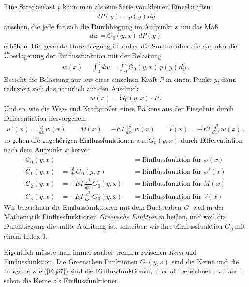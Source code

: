 Eine Streckenlast $p$ kann man als eine Serie von kleinen Einzelkr\"{a}ften
\begin{align}
dP(y) = p(y)\,dy
\end{align}
ansehen, die jede f\"{u}r sich die Durchbiegung im Aufpunkt $x$ um das Ma{\ss}
\begin{align}
dw = G_0(y,x)\,dP(y)
\end{align}
erh\"{o}hen. Die gesamte Durchbiegung ist daher die Summe \"{u}ber die $dw$, also die \"{U}berlagerung der Einflussfunktion mit der Belastung
\begin{align} \label{Eq37}
w(x) = \int_0^{\,l} dw = \int_0^{\,l} G_0(y,x)\,p(y)\,dy\,.
\end{align}
Besteht die Belastung nur aus einer einzelnen Kraft $P$ in einem Punkt $y$, dann reduziert sich das nat\"{u}rlich auf den Ausdruck
\begin{align}
w(x) = G_0(y,x) \cdot P\,.
\end{align}
Und so, wie die Weg- und Kraftgr\"{o}{\ss}en eines Balkens aus der Biegelinie durch Differentiation hervorgehen,
\begin{align}
w'(x) = \frac{d}{dx}\,w(x) \qquad M(x) = - EI\,\frac{d^2}{dx^2}\,w(x) \qquad V(x) = - EI\,\frac{d^3}{dx^3}\,w(x)\,,
\end{align}
so gehen die zugeh\"{o}rigen Einflussfunktionen aus $G_0(y,x)$ durch Differentiation nach dem Aufpunkt $x$ hervor
\begin{subequations}
\begin{alignat}{3}
G_0(y,x) & \phantom{\frac{d}{dx} G_0(y,x)} &&= \text{Einflussfunktion f\"{u}r $w(x)$}\\
G_1(y,x) &= \frac{d}{dx} G_0(y,x) &&= \text{Einflussfunktion f\"{u}r $w'(x)$}\\
G_2(y,x) &= - EI\,\frac{d^2}{dx^2} G_0(y,x) &&= \text{Einflussfunktion f\"{u}r $M(x)$}\\
G_3(y,x) &= - EI\,\frac{d^3}{dx^3} G_0(y,x) &&= \text{Einflussfunktion f\"{u}r $V(x)$}
\end{alignat}
\end{subequations}
Wir bezeichnen die Einflussfunktionen mit dem Buchstaben $G$, weil in der Mathematik Einflussfunktionen {\em Greensche Funktionen\/} hei{\ss}en, und weil die Durchbiegung die nullte Ableitung ist, schreiben wir ihre Einflussfunktion $G_0 $ mit einem Index $0$.

Eigentlich m\"{u}sste man immer sauber trennen zwischen {\em Kern\/} und Einflussfunktion. Die Greenschen Funktionen $G_i(y,x)$ sind die Kerne und die Integrale wie (\ref{Eq37}) sind die Einflussfunktionen, aber oft bezeichnet man auch schon die Kerne als Einflussfunktionen.

